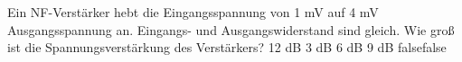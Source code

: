     {Ein NF-Verstärker hebt die Eingangsspannung von 1 mV auf 4 mV Ausgangsspannung an. Eingangs- und Ausgangswiderstand sind gleich. Wie groß ist die Spannungsverstärkung des Verstärkers?}
    {12 dB}
    {3 dB}
    {6 dB}
    {9 dB}
    {false}{false}